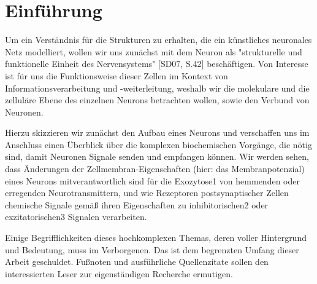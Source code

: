 \chapter{Einführung}

Um ein Verständnis für die Strukturen zu erhalten, die ein künstliches neuronales Netz modelliert, wollen wir uns zunächst mit dem Neuron als "strukturelle und funktionelle Einheit des Nervensystems" [SD07, S.42] beschäftigen.
Von Interesse ist für uns die Funktionsweise dieser Zellen im Kontext von Informationsverarbeitung und -weiterleitung, weshalb wir die molekulare und die zelluläre Ebene des einzelnen Neurons betrachten wollen, sowie den Verbund von Neuronen.

Hierzu skizzieren wir zunächst den Aufbau eines Neurons und verschaffen uns im Anschluss einen Überblick über die komplexen biochemischen Vorgänge, die nötig sind, damit Neuronen Signale senden und empfangen können. Wir werden sehen, dass Änderungen der Zellmembran-Eigenschaften (hier: das Membranpotenzial) eines Neurons mitverantwortlich sind für die Exozytose1 von hemmenden oder erregenden Neurotransmittern, und wie Rezeptoren postsynaptischer Zellen chemische Signale gemäß ihren Eigenschaften zu inhibitorischen2 oder exzitatorischen3 Signalen verarbeiten.

Einige Begrifflichkeiten dieses hochkomplexen Themas, deren voller Hintergrund und Bedeutung, muss im Verborgenen. Das ist dem begrenzten Umfang dieser Arbeit geschuldet. Fußnoten und ausführliche Quellenzitate sollen den interessierten Leser zur eigenständigen Recherche ermutigen.
